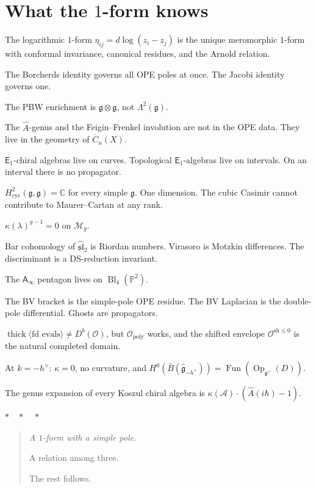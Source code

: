 \documentclass[11pt]{article}
\newcommand{\cA}{\mathcal{A}}
\newcommand{\cM}{\mathcal{M}}
\newcommand{\cO}{\mathcal{O}}
\newcommand{\fg}{\mathfrak{g}}
\newcommand{\fsl}{\mathfrak{sl}}
\newcommand{\B}{\bar{B}}
\newcommand{\C}{\mathbb{C}}
\newcommand{\bP}{\mathbb{P}}
\newcommand{\Eone}{\mathsf{E}_1}
\newcommand{\Ainf}{\mathsf{A}_{\infty}}
\newcommand{\Op}{\operatorname{Op}}
\newcommand{\Fun}{\operatorname{Fun}}
\newcommand{\thick}{\operatorname{thick}}
\DeclareMathOperator{\Bl}{Bl}
\begin{document}
\section{What the $1$-form knows}
\label{sec:knows}

The logarithmic $1$-form $\eta_{ij} = d\log(z_i - z_j)$ is the
unique meromorphic $1$-form with conformal invariance, canonical
residues, and the Arnold relation.

The Borcherds identity governs all OPE poles at once.  The Jacobi
identity governs one.

The PBW enrichment is $\fg \otimes \fg$, not $\Lambda^2(\fg)$.

The $\hat{A}$-genus and the Feigin--Frenkel involution are not
in the OPE data.  They live in the geometry of $\overline{C}_n(X)$.

$\Eone$-chiral algebras live on curves.  Topological
$\Eone$-algebras live on intervals.  On an interval there is no
propagator.

$H^2_{\mathrm{cyc}}(\fg,\fg) = \C$ for every simple $\fg$.  One
dimension.  The cubic Casimir cannot contribute to
Maurer--Cartan at any rank.

$\kappa(\lambda)^{g-1} = 0$ on $\cM_g$.

Bar cohomology of $\widehat{\fsl}_2$ is Riordan numbers.
Virasoro is Motzkin differences.  The discriminant is a
DS-reduction invariant.

The $\Ainf$ pentagon lives on $\Bl_4(\bP^2)$.

The BV bracket is the simple-pole OPE residue.  The BV Laplacian
is the double-pole differential.  Ghosts are propagators.

$\thick\langle\text{fd evals}\rangle \neq D^b(\cO)$, but
$\cO_{\mathrm{poly}}$ works, and the shifted envelope
$\cO^{\mathrm{sh}\leq 0}$ is the natural completed domain.

At $k = -h^\vee$: $\kappa = 0$, no curvature, and
$H^0(\B(\widehat{\fg}_{-h^\vee})) = \Fun(\Op_{\fg^\vee}(D))$.

The genus expansion of every Koszul chiral algebra is
$\kappa(\cA) \cdot (\hat{A}(i\hbar) - 1)$.

\bigskip
\begin{center}
$*\quad*\quad*$
\end{center}

\begin{quote}\itshape
A $1$-form with a simple pole.

A relation among three.

The rest follows.
\end{quote}
\end{document}
